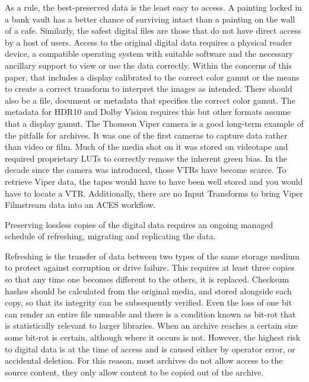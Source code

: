 As a rule, the best-preserved data is the least easy to access. A painting locked in a bank vault has a better chance of surviving intact than a painting on the wall of a cafe. Similarly, the safest digital files are those that do not have direct access by a host of users. Access to the original digital data requires a physical reader device, a compatible operating system with suitable software and the necessary ancillary support to view or use the data correctly. Within the concerns of this paper, that includes a display calibrated to the correct color gamut or the means to create a correct transform to interpret the images as intended. There should also be a file, document or metadata that specifies the correct color gamut. The metadata for HDR10 and Dolby Vision requires this but other formats assume that a display gamut. The Thomson Viper camera is a good long-term example of the pitfalls for archives. It was one of the first cameras to capture data rather than video or film. Much of the media shot on it was stored on videotape and required proprietary LUTs to correctly remove the inherent green bias. In the decade since the camera was introduced, those VTRs have become scarce. To retrieve Viper data, the tapes would have to have been well stored and you would have to locate a VTR. Additionally, there are no Input Transforms to bring Viper Filmstream data into an ACES workflow.

Preserving lossless copies of the digital data requires an ongoing managed schedule of refreshing, migrating and replicating the data. 

Refreshing is the transfer of data between two types of the same storage medium to protect against corruption or drive failure. This requires at least three copies so that any time one becomes different to the others, it is replaced. Checksum hashes should be calculated from the original media, and stored alongside each copy, so that its integrity can be subsequently verified. Even the loss of one bit can render an entire file unusable and there is a condition known as bit-rot that is statistically relevant to larger libraries. When an archive reaches a certain size some bit-rot is certain, although where it occurs is not. However, the highest risk to digital data is at the time of access and is caused either by operator error, or accidental deletion. For this reason, most archives do not allow access to the source content, they only allow content to be copied out of the archive. 

